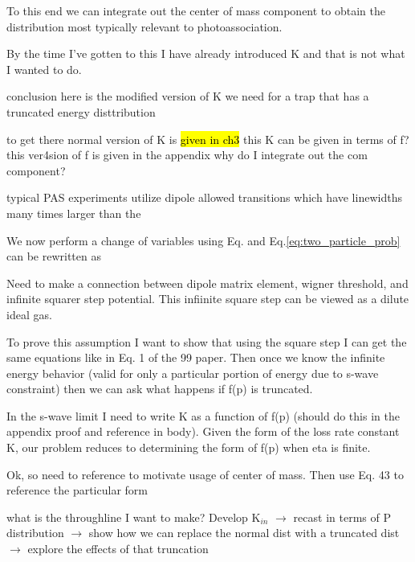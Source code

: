 To this end we can integrate out the center of mass component to obtain the distribution most typically relevant to photoassociation.

By the time I've gotten to this I have already introduced K and that is not what I wanted to do. 

conclusion
here is the modified version of K we need for a trap that has a truncated energy disttribution

to get there
normal version of K is \hl{given in ch3}
this K can be given in terms of f? 
this ver4sion of f is given in the appendix
	why do I integrate out the com component?




typical PAS experiments utilize dipole allowed transitions which have linewidths many times larger than the 



We now perform a change of variables using Eq. and Eq.\ref{eq:two_particle_prob} can be rewritten as 




Need to make a connection between dipole matrix element, wigner threshold, and infinite squarer step potential. This infiinite square step can be viewed as a dilute ideal gas. 

To prove this assumption I want to show that using the square step I can get the same equations like in Eq. 1 of the 99 paper. Then once we know the infinite energy behavior (valid for only a particular portion of energy due to s-wave constraint) then we can ask what happens if f(p) is truncated. 

In the s-wave limit I need to write K as a function of f(p) (should do this in the appendix proof and reference in body). Given the form of the loss rate constant K, our problem reduces to determining the form of f(p) when eta is finite.

Ok, so need to reference \cite{Ciuryo2004} to motivate usage of center of mass. Then use \cite{Nicholson2015a} Eq. 43 to reference the particular form 


what is the throughline I want to make? Develop K$_{in}$ $\rightarrow$ recast in terms of P distribution $\rightarrow$ show how we can replace the normal dist with a truncated dist $\rightarrow$ explore the effects of that truncation 
